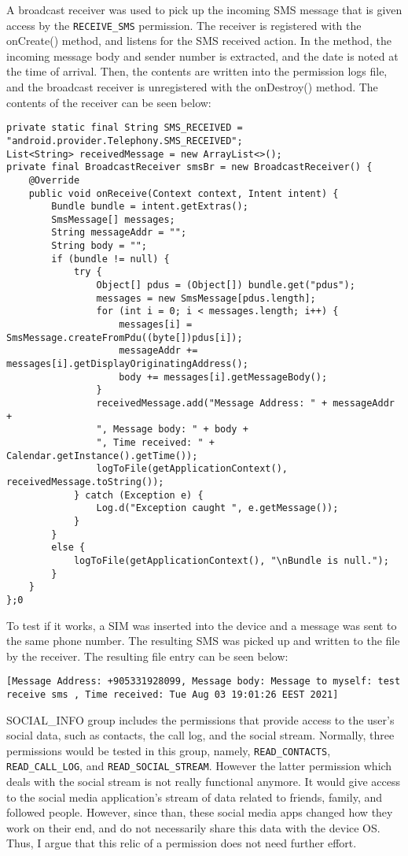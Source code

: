 \documentclass[
  a4paper,  %
  twoside,  %
  bibliography=totoc,
  headsepline,
  cleardoublepage=empty,
  parskip=half,
  draft=false,
  open=any
]{scrbook}
\begin{document}
A broadcast receiver was used to pick up the incoming SMS message that is given access by the \texttt{RECEIVE\_SMS} permission. The receiver is registered with the onCreate() method, and listens for the SMS received action. In the method, the incoming message body and sender number is extracted, and the date is noted at the time of arrival. Then, the contents are written into the permission logs file, and the broadcast receiver is unregistered with the onDestroy() method. The contents of the receiver can be seen below:
\begin{lstlisting}
private static final String SMS_RECEIVED = "android.provider.Telephony.SMS_RECEIVED";
List<String> receivedMessage = new ArrayList<>();
private final BroadcastReceiver smsBr = new BroadcastReceiver() {
	@Override
	public void onReceive(Context context, Intent intent) {
		Bundle bundle = intent.getExtras();
		SmsMessage[] messages;
		String messageAddr = "";
		String body = "";
		if (bundle != null) {
			try {
				Object[] pdus = (Object[]) bundle.get("pdus");
				messages = new SmsMessage[pdus.length];
				for (int i = 0; i < messages.length; i++) {
					messages[i] = SmsMessage.createFromPdu((byte[])pdus[i]);
					messageAddr += messages[i].getDisplayOriginatingAddress();
					body += messages[i].getMessageBody();
				}
				receivedMessage.add("Message Address: " + messageAddr +
				", Message body: " + body +
				", Time received: " + Calendar.getInstance().getTime());
				logToFile(getApplicationContext(), receivedMessage.toString());
			} catch (Exception e) {
				Log.d("Exception caught ", e.getMessage());
			}
		}
		else {
			logToFile(getApplicationContext(), "\nBundle is null.");
		}
	}
};0
\end{lstlisting}

To test if it works, a SIM was inserted into the device and a message was sent to the same phone number. The resulting SMS was picked up and written to the file by the receiver. The resulting file entry can be seen below:
\begin{lstlisting}
[Message Address: +905331928099, Message body: Message to myself: test receive sms , Time received: Tue Aug 03 19:01:26 EEST 2021]
\end{lstlisting}

SOCIAL\_INFO group includes the permissions that provide access to the user's social data, such as contacts, the call log, and the social stream. Normally, three permissions would be tested in this group, namely, \texttt{READ\_CONTACTS}, \texttt{READ\_CALL\_LOG}, and \texttt{READ\_SOCIAL\_STREAM}. However the latter permission which deals with the social stream is not really functional anymore. It would give access to the social media application's stream of data related to friends, family, and followed people. However, since than, these social media apps changed how they work on their end, and do not necessarily share this data with the device OS. Thus, I argue that this relic of a permission does not need further effort.
\end{document}
